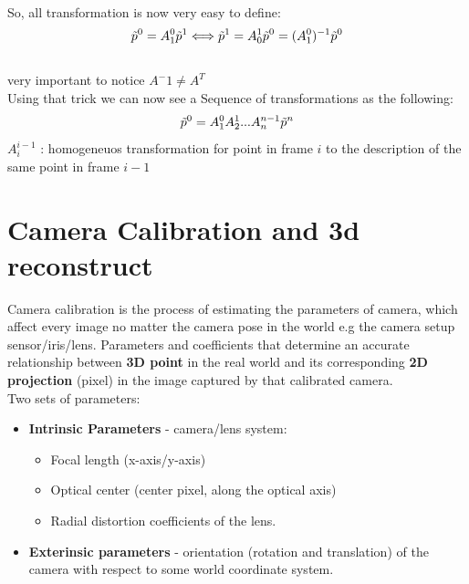 \documentclass{article}
\begin{document}
    \\ So, all transformation is now very easy to define:
    \begin{gather*}
        \Tilde{p}^0 = A^0_1\Tilde{p}^1 \Longleftrightarrow \Tilde{p}^1 = A^1_0\Tilde{p}^0 = (A^0_1)^{-1}\Tilde{p}^0
    \end{gather*}
    \\very important to notice $A^-1\ne A^T$
    \\Using that trick we can now see a Sequence of transformations as the following:
    \begin{gather}
        \Tilde{p}^0 = A^0_1A^1_2...A^{n-1}_n\Tilde{p}^n
    \end{gather}
    $A^{i-1}_i$ : homogeneuos transformation for point in frame $i$ to the description of the same point in frame $i-1$

\section{Camera Calibration and 3d reconstruct}
Camera calibration is the process of estimating the parameters of camera, which affect every image no matter the camera pose in the world e.g the camera setup sensor/iris/lens. Parameters and coefficients that determine an accurate relationship between \textbf{3D point} in the real world and its corresponding \textbf{2D projection} (pixel) in the image captured by that calibrated camera.\\
Two sets of parameters:
\begin{itemize}
    \item \textbf{Intrinsic Parameters} - camera/lens system:
    \begin{itemize}
        \item Focal length (x-axis/y-axis)
        \item Optical center (center pixel, along the optical axis)
        \item Radial distortion coefficients of the lens.
    \end{itemize}
    \item \textbf{Exterinsic parameters} - orientation (rotation and translation) of the camera with respect to some world coordinate system.
\end{itemize}
\end{document}
